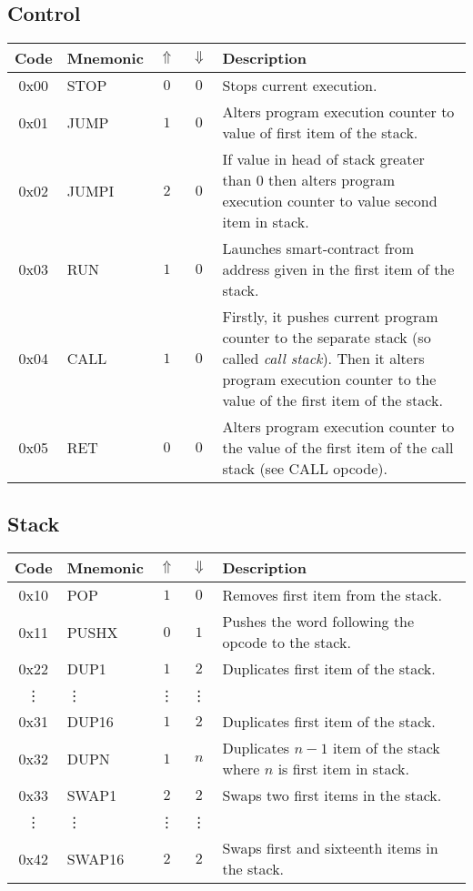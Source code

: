 \documentclass[12pt,a4paper]{article}
\begin{document}
\subsection{Control}
\begin{tabularx}{\textwidth}{ c l c c p{7cm} }
\textbf{Code} & \textbf{Mnemonic} & \textbf{$\Uparrow$} & \textbf{$\Downarrow$} & \textbf{Description} \\
\hline
0x00 & STOP & $0$ & $0$ & Stops current execution. \\
\hline
0x01 & JUMP & $1$ & $0$ & Alters program execution counter to value of first item of the stack. \\
\hline
0x02 & JUMPI & $2$ & $0$ & If value in head of stack greater than 0 then alters program execution counter to value second item in stack.  \\
\hline
0x03 & RUN & $1$ & $0$ & Launches smart-contract from address given in the first item of the stack.  \\
\hline
0x04 & CALL & $1$ & $0$ & Firstly, it pushes current program counter to the separate stack (so called \emph{call stack}). Then it alters program execution counter to the value of the first item of the stack.  \\
\hline
0x05 & RET & $0$ & $0$ & Alters program execution counter to the value of the first item of the call stack (see CALL opcode).  \\

\end{tabularx}

\subsection{Stack}
\begin{tabularx}{\textwidth}{ c l c c p{7cm} }
\textbf{Code} & \textbf{Mnemonic} & \textbf{$\Uparrow$} & \textbf{$\Downarrow$} & \textbf{Description} \\
\hline
0x10 & POP & $1$ & $0$ & Removes first item from the stack. \\
\hline
0x11 & PUSHX & $0$ & $1$ & Pushes the word following the opcode to the stack. \\
\hline
0x22 & DUP1 & $1$ & $2$ & Duplicates first item of the stack. \\
\vdots & \vdots & \vdots & \vdots \\
0x31 & DUP16 & $1$ & $2$ & Duplicates first item of the stack. \\
\hline
0x32 & DUPN & $1$ & $n$ & Duplicates $n-1$ item of the stack where $n$ is first item in stack. \\
\hline
0x33 & SWAP1 & $2$ & $2$ & Swaps two first items in the stack. \\
\vdots & \vdots & \vdots & \vdots \\
0x42 & SWAP16 & $2$ & $2$ & Swaps first and sixteenth items in the stack. \\
\hline
\end{tabularx}
\end{document}
